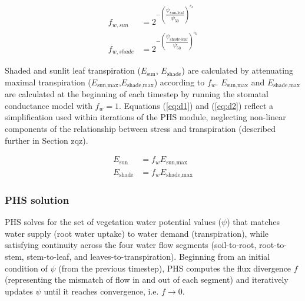 \documentclass[draft,linenumbers]{agujournal}
\begin{document}
     \begin{linenomath*}
     \begin{equation}
     \begin{aligned}
     \label{eq:d1}
     f_{w,sun} &= 2^{-\left(\dfrac{\psi_{\text{sun-leaf}}}{\psi_{50}}\right)^{c_k}} \\
     f_{w,shade} &= 2^{-\left(\dfrac{\psi_{\text{shade-leaf}}}{\psi_{50}}\right)^{c_k}}
     \end{aligned}     
     \end{equation}
     \end{linenomath*}
     
     Shaded and sunlit leaf transpiration ($E_{\text{sun}}$, $E_{\text{shade}}$) are calculated by attenuating maximal transpiration ($E_{\text{sun,max}}$,$E_{\text{shade,max}}$) according to $f_w$. 
     $E_{\text{sun,max}}$ and $E_{\text{shade,max}}$ are calculated at the beginning of each timestep by running the stomatal conductance model with $f_w=1$.
     Equations (\ref{eq:d1}) and (\ref{eq:d2}) reflect a simplification used within iterations of the PHS module, 
     neglecting non-linear components of the relationship between stress and transpiration (described further in Section zqz).
     
     \begin{linenomath*}
     \begin{equation}
     \begin{aligned}
     \label{eq:d2}
     E_{\text{sun}} & = f_wE_{\text{sun,max}} \\
     E_{\text{shade}} & = f_wE_{\text{shade,max}}
     \end{aligned}     
     \end{equation}
     \end{linenomath*}
     

    \subsubsection{PHS solution}
    \label{sect:solution}
    
    PHS solves for the set of vegetation water potential values ($\psi$) that matches water supply (root water uptake) to water demand (transpiration), while satisfying continuity across the four water flow segments (soil-to-root, root-to-stem, stem-to-leaf, and leaves-to-transpiration). 
    Beginning from an initial condition of $\psi$ (from the previous timestep), PHS computes the flux divergence $f$ (representing the mismatch of flow in and out of each segment) and iteratively updates $\psi$ until it reaches convergence, i.e. $f\to0$.
    
\end{document}
